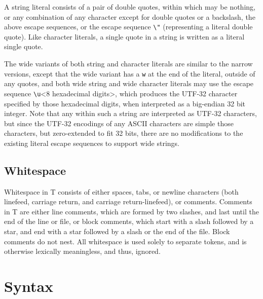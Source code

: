 \documentclass[letterpaper,12pt]{book}
\begin{document}
A string literal consists of a pair of double quotes, within which may be nothing, or any combination of any character except for double quotes or a backslash, the above escape sequences, or the escape sequence \verb|\"| (representing a literal double quote). Like character literals, a single quote in a string is written as a literal single quote.

The wide variants of both string and character literals are similar to the narrow versions, except that the wide variant has a \texttt{w} at the end of the literal, outside of any quotes, and both wide string and wide character literals may use the escape sequence \verb|\u|{\textless}8 hexadecimal digits{\textgreater}, which produces the UTF-32 character specified by those hexadecimal digits, when interpreted as a big-endian 32 bit integer. Note that any within such a string are interpreted as UTF-32 characters, but since the UTF-32 encodings of any ASCII characters are simple those characters, but zero-extended to fit 32 bits, there are no modifications to the existing literal escape sequences to support wide strings.

\section{Whitespace}

Whitespace in T consists of either spaces, tabs, or newline characters (both linefeed, carriage return, and carriage return-linefeed), or comments. Comments in T are either line comments, which are formed by two slashes, and last until the end of the line or file, or block comments, which start with a slash followed by a star, and end with a star followed by a slash or the end of the file. Block comments do not nest. All whitespace is used solely to separate tokens, and is otherwise lexically meaningless, and thus, ignored.

\chapter{Syntax}
\end{document}
